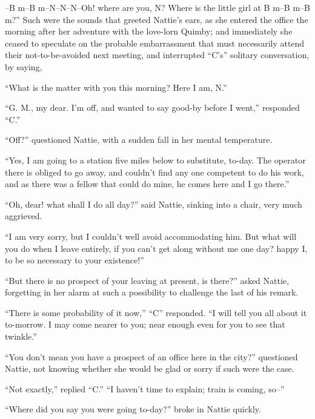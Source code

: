 \ifChapterNoPageBreak
\clearpage%
\fi






--B m--B m--N--N--N--Oh! where are you, N? Where is the little girl at
B m--B m--B m?''\Fparn%
Such were the sounds that greeted Nattie's ears, as she entered the
office the morning after her adventure with the love-lorn Quimby; and
immediately she ceased to speculate on the probable embarrassment that
must necessarily attend their not-to-be-avoided next meeting, and
interrupted ``C's'' solitary conversation, by saying,

``What is the matter with you this morning? Here I am, N.''

``G. M., my dear. I'm off, and wanted to say good-by before I went,''
responded ``C.''

``Off?'' questioned Nattie, with a sudden fall in her mental temperature.

``Yes, I am going to a station five miles below to substitute, to-day.
The operator there is obliged to go away, and couldn't find any one
competent to do his work, and as there was a fellow that could do mine,
he comes here and I go there.''

``Oh, dear! what shall I do all day?'' said Nattie, sinking into a chair,
very much aggrieved.

``I am very sorry, but I couldn't well avoid accommodating him. But what
will you do when I leave entirely, if you can't get along without me one
day? happy I, to be so necessary to your existence!''

``But there is no prospect of your leaving at present, is there?'' asked
Nattie, forgetting in her alarm at such a possibility to challenge the
last of his remark.

``There is some probability of it now,'' ``C'' responded. ``I will tell you
all about it to-morrow. I may come nearer to you; near enough even for
you to see that twinkle.''

``You don't mean you have a prospect of an office here in the city?''
questioned Nattie, not knowing whether she would be glad or sorry if
such were the case.

``Not exactly,'' replied ``C.'' ``I haven't time to explain; train is coming,
so--''

``Where did you say you were going to-day?'' broke in Nattie quickly.

